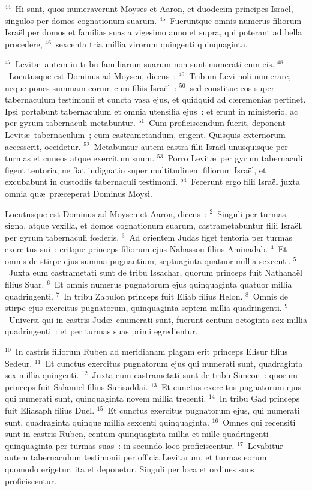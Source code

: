 ${}^{44}$~Hi sunt, quos numeraverunt Moyses et Aaron, et duodecim principes Isra\"el, singulos per domos cognationum suarum.
${}^{45}$~Fueruntque omnis numerus filiorum Isra\"el per domos et familias suas a vigesimo anno et supra, qui poterant ad bella procedere,
${}^{46}$~sexcenta tria millia virorum quingenti quinquaginta.


${}^{47}$~Levit\ae\ autem in tribu familiarum suarum non sunt numerati cum eis.
${}^{48}$~Locutusque est Dominus ad Moysen, dicens~:
${}^{49}$~Tribum Levi noli numerare, neque pones summam eorum cum filiis Isra\"el~:
${}^{50}$~sed constitue eos super tabernaculum testimonii et cuncta vasa ejus, et quidquid ad c\ae remonias pertinet. Ipsi portabunt tabernaculum et omnia utensilia ejus~: et erunt in ministerio, ac per gyrum tabernaculi metabuntur.
${}^{51}$~Cum proficiscendum fuerit, deponent Levit\ae\ tabernaculum~; cum castrametandum, erigent. Quisquis externorum accesserit, occidetur.
${}^{52}$~Metabuntur autem castra filii Isra\"el unusquisque per turmas et cuneos atque exercitum suum.
${}^{53}$~Porro Levit\ae\ per gyrum tabernaculi figent tentoria, ne fiat indignatio super multitudinem filiorum Isra\"el, et excubabunt in custodiis tabernaculi testimonii.
${}^{54}$~Fecerunt ergo filii Isra\"el juxta omnia qu\ae\ pr\ae ceperat Dominus Moysi.

\lettrine[lines=3,image=true,loversize=0.05,lraise=-0.03]{L}{}ocutusque est Dominus ad Moysen et Aaron, dicens~:
${}^{2}$~Singuli per turmas, signa, atque vexilla, et domos cognationum suarum, castrametabuntur filii Isra\"el, per gyrum tabernaculi fœderis.
${}^{3}$~Ad orientem Judas figet tentoria per turmas exercitus sui~: eritque princeps filiorum ejus Nahasson filius Aminadab.
${}^{4}$~Et omnis de stirpe ejus summa pugnantium, septuaginta quatuor millia sexcenti.
${}^{5}$~Juxta eum castrametati sunt de tribu Issachar, quorum princeps fuit Nathana\"el filius Suar.
${}^{6}$~Et omnis numerus pugnatorum ejus quinquaginta quatuor millia quadringenti.
${}^{7}$~In tribu Zabulon princeps fuit Eliab filius Helon.
${}^{8}$~Omnis de stirpe ejus exercitus pugnatorum, quinquaginta septem millia quadringenti.
${}^{9}$~Universi qui in castris Jud\ae\ enumerati sunt, fuerunt centum octoginta sex millia quadringenti~: et per turmas suas primi egredientur.


${}^{10}$~In castris filiorum Ruben ad meridianam plagam erit princeps Elisur filius Sedeur.
${}^{11}$~Et cunctus exercitus pugnatorum ejus qui numerati sunt, quadraginta sex millia quingenti.
${}^{12}$~Juxta eum castrametati sunt de tribu Simeon~: quorum princeps fuit Salamiel filius Surisaddai.
${}^{13}$~Et cunctus exercitus pugnatorum ejus qui numerati sunt, quinquaginta novem millia trecenti.
${}^{14}$~In tribu Gad princeps fuit Eliasaph filius Duel.
${}^{15}$~Et cunctus exercitus pugnatorum ejus, qui numerati sunt, quadraginta quinque millia sexcenti quinquaginta.
${}^{16}$~Omnes qui recensiti sunt in castris Ruben, centum quinquaginta millia et mille quadringenti quinquaginta per turmas suas~: in secundo loco proficiscentur.
${}^{17}$~Levabitur autem tabernaculum testimonii per officia Levitarum, et turmas eorum~: quomodo erigetur, ita et deponetur. Singuli per loca et ordines suos proficiscentur.


